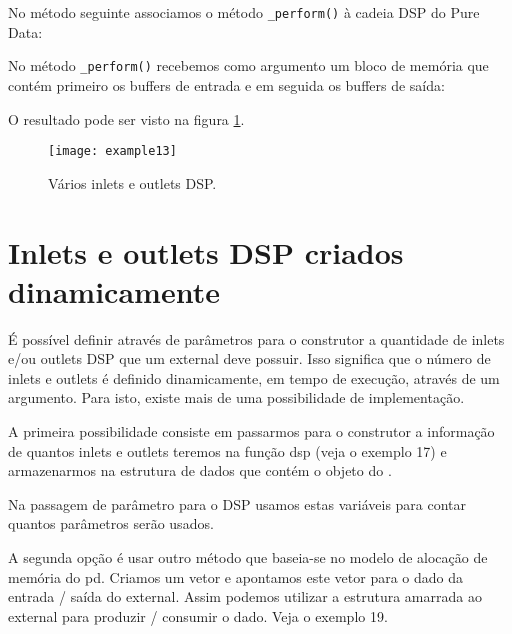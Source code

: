 

No método seguinte associamos o método \texttt{\_perform()} à cadeia DSP do
Pure Data:



No método \texttt{\_perform()} recebemos como argumento um bloco de memória
que contém primeiro os buffers de entrada e em seguida os buffers de saída:



O resultado pode ser visto na figura \ref{fig:varios-inlets-outlets}.

\begin{figure}[h!]
\centering
\texttt{[image: example13]}
\caption{Vários inlets e outlets DSP.}
\label{fig:varios-inlets-outlets}
\end{figure}

\section{Inlets e outlets DSP criados dinamicamente}

É possível definir através de parâmetros para o construtor a quantidade de
inlets e/ou outlets DSP que um external deve possuir. Isso significa que o
número de inlets e outlets é definido dinamicamente, em tempo de execução,
através de um argumento. Para isto, existe mais de uma possibilidade de
implementação.

A primeira possibilidade consiste em passarmos para o construtor a informação
de quantos inlets e outlets teremos na função dsp (veja o exemplo
17) e armazenarmos na estrutura de dados que contém o objeto do \external.



Na passagem de parâmetro para o DSP usamos estas variáveis para contar quantos
parâmetros serão usados.



A segunda opção é usar outro método que baseia-se no modelo de alocação de
memória do pd. Criamos um vetor e apontamos este vetor para o dado da entrada
/ saída do external. Assim podemos utilizar a estrutura amarrada ao external
para produzir / consumir o dado. Veja o exemplo 19.

